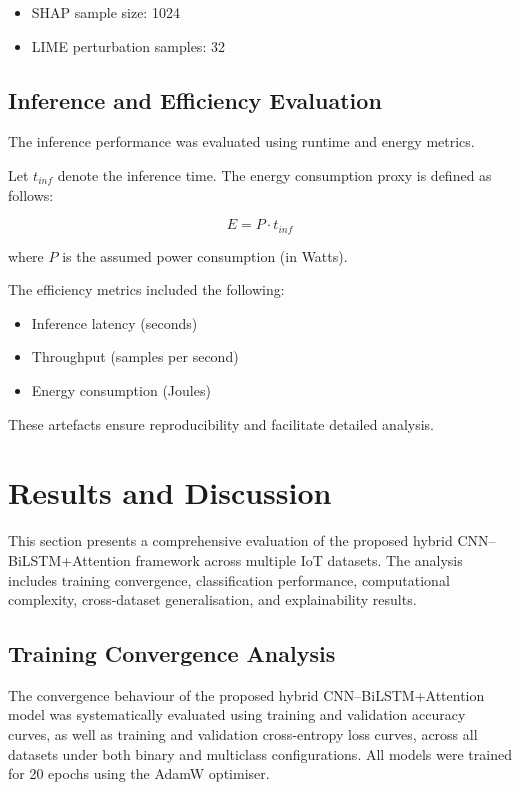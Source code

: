 \documentclass[a4paper,fleqn]{cas-sc}
\begin{document}
\begin{itemize}
    \item SHAP sample size: 1024
    \item LIME perturbation samples: 32
\end{itemize}



\subsection{Inference and Efficiency Evaluation}

The inference performance was evaluated using runtime and energy metrics.

Let $t_{inf}$ denote the inference time. The energy consumption proxy is defined as follows:

\begin{equation}
E = P \cdot t_{inf}
\end{equation}

where $P$ is the assumed power consumption (in Watts).

The efficiency metrics included the following:

\begin{itemize}
    \item Inference latency (seconds)
    \item Throughput (samples per second)
    \item Energy consumption (Joules)
\end{itemize}

These artefacts ensure reproducibility and facilitate detailed analysis.

\section{Results and Discussion}
\label{sec:results}

This section presents a comprehensive evaluation of the proposed hybrid CNN--BiLSTM+Attention framework across multiple IoT datasets. The analysis includes training convergence, classification performance, computational complexity, cross-dataset generalisation, and explainability results.

\subsection{Training Convergence Analysis}

The convergence behaviour of the proposed hybrid CNN--BiLSTM+Attention model was systematically evaluated using training and validation accuracy curves, as well as training and validation cross-entropy loss curves, across all datasets under both binary and multiclass configurations. All models were trained for 20 epochs using the AdamW optimiser.
\end{document}
